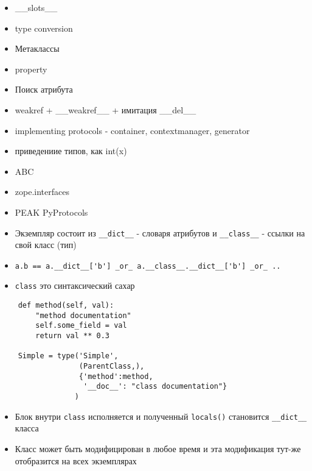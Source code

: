 \documentclass{article}
\begin{document}
\LARGE

\begin{itemize}
    \item \_\_slots\_\_
    \item type conversion
    \item Метаклассы
    \item property
    \item Поиск атрибута
    \item weakref + \_\_weakref\_\_ + имитация \_\_del\_\_
    \item implementing protocols - container, contextmanager, generator
    \item приведениие типов, как int(x)
    \item ABC
    \item zope.interfaces
    \item PEAK PyProtocols
\end{itemize}
\newpage

\begin{itemize}
\item Экземпляр состоит из \lstinline!__dict__! - словаря атрибутов и 
        \lstinline!__class__! - ссылки на свой класс (тип)
\item \lstinline!a.b == a.__dict__['b'] _or_ a.__class__.__dict__['b'] _or_ ..!
\end{itemize}
\newpage

\begin{itemize}
\item \lstinline!class! это синтаксический сахар
\end{itemize}
{
\LARGE \vspace{15pt}
\begin{lstlisting}
    def method(self, val):
        "method documentation"
        self.some_field = val
        return val ** 0.3

    Simple = type('Simple', 
                  (ParentClass,), 
                  {'method':method, 
                   '__doc__': "class documentation"}
                 )
\end{lstlisting}
}
\newpage

\begin{itemize}

\item Блок внутри \lstinline!class! исполняется и 
        полученный \lstinline!locals()! становится 
            \lstinline!__dict__! класса
\item Класс может быть модифицирован в любое время и эта модификация 
        тут-же отобразится на всех экземплярах 

\end{itemize}
\newpage
\end{document}
